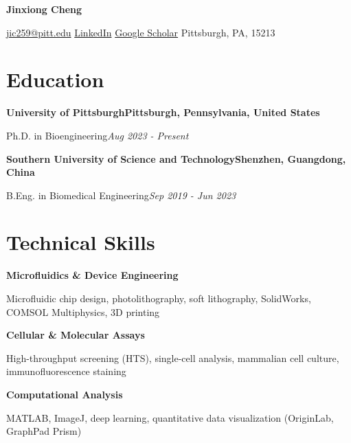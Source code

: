 \documentclass[a4paper,10pt]{article}
\newcommand{\rowbb}[2]{\noindent\textbf{#1}\hfill\textbf{#2}\par}   %
\newcommand{\rowni}[2]{\noindent#1\hfill\textit{#2}\par}            %
\begin{document}
\fontsize{8.6}{10.4}\selectfont

\begin{center}
  {\fontsize{18}{22}\selectfont\bfseries Jinxiong Cheng\par}
  \vspace{2pt}
  {\fontsize{10}{12}\selectfont
    \href{mailto:jic259@pitt.edu}{jic259@pitt.edu} \textbar{}
    \href{https://www.linkedin.com/in/jinxiong-cheng-9409a0245}{LinkedIn} \textbar{}
    \href{https://scholar.google.com/citations?user=uTVw50sAAAAJ&hl=en}{Google Scholar} \textbar{}
    Pittsburgh, PA, 15213\par}
\end{center}

\section*{Education}

\rowbb{University of Pittsburgh}{Pittsburgh, Pennsylvania, United States}
\rowni{Ph.D. in Bioengineering}{Aug 2023 - Present}
\vspace{2pt}

\rowbb{Southern University of Science and Technology}{Shenzhen, Guangdong, China}
\rowni{B.Eng. in Biomedical Engineering}{Sep 2019 - Jun 2023}

\section*{Technical Skills}

\textbf{Microfluidics \& Device Engineering}\par
Microfluidic chip design, photolithography, soft lithography, SolidWorks,
COMSOL Multiphysics, 3D printing\par
\vspace{2pt}

\textbf{Cellular \& Molecular Assays}\par
High-throughput screening (HTS), single-cell analysis, mammalian cell culture,
immunofluorescence staining\par
\vspace{2pt}

\textbf{Computational Analysis}\par
MATLAB, ImageJ, deep learning, quantitative data visualization
(OriginLab, GraphPad Prism)\par
\vspace{2pt}
\end{document}
